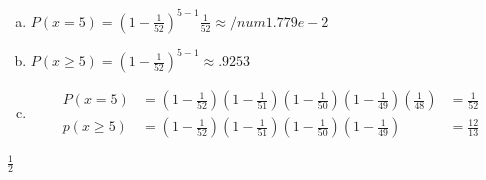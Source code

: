 \documentclass[12pt]{article}
\newenvironment{problem}[2][Problem]{\begin{trivlist}
\item[\hskip \labelsep {\bfseries #1}\hskip \labelsep {\bfseries #2.}]
  \vspace{1 cm}
}{\end{trivlist}}
\begin{document}
\begin{problem}{2.51}
\item
  \begin{enumerate}[a.]
    \item %
      $P(x=5) = (1-\frac{1}{52})^{5-1} \frac{1}{52} \approx /num{1.779e-2}$
    \item %
      $P(x\geq5) = (1-\frac{1}{52})^{5-1} \approx .9253$
    \item %
      \begin{align*}
        P(x=5)
        &= (1-\frac{1}{52})(1-\frac{1}{51})(1-\frac{1}{50})(1-\frac{1}{49})(\frac{1}{48})
        &= \frac{1}{52} \\
        p(x\geq5) 
        &=(1-\frac{1}{52})(1-\frac{1}{51})(1-\frac{1}{50})(1-\frac{1}{49})
        &= \frac{12}{13}
      \end{align*}
  \end{enumerate}
\end{problem}

\begin{problem}{2.53}
\item
  $\frac{1}{2}$
\end{problem}

\begin{problem}{2.55} %
\item
\end{problem}

\begin{problem}{2.57} %
\item
\end{problem}

\begin{problem}{2.59} %
\item
\end{problem}

\begin{problem}{2.61} %
\item
\end{problem}

\begin{problem}{2.63} %
\item
\end{problem}

\begin{problem}{2.65} %
\item
\end{problem}

\begin{problem}{2.67} %
\item
\end{problem}

\begin{problem}{2.81} %
\item
\end{problem}


\begin{problem}{2.83} %
\item
\end{problem}
\end{document}

